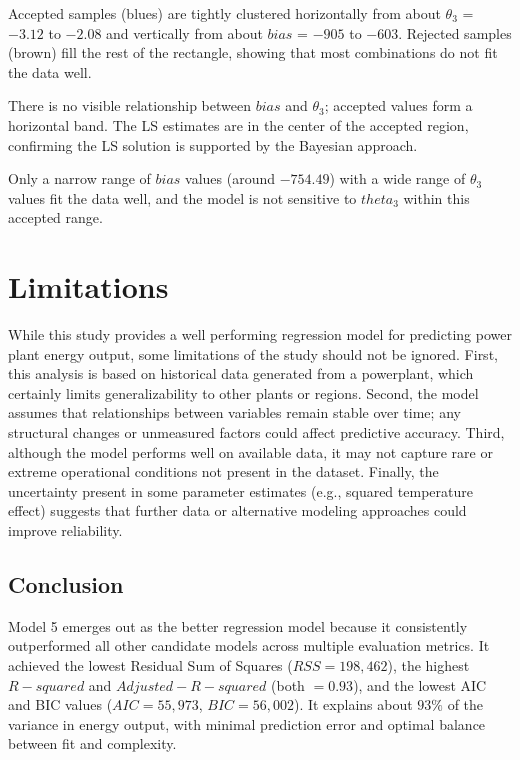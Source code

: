 \documentclass[12pt,a4paper]{article}
\begin{document}
Accepted samples (blues) are tightly clustered horizontally 
from about $\theta_3$ = $-3.12$ to $-2.08$ and vertically from 
about $bias$ = $-905$ to $-603$. Rejected samples (brown) fill the 
rest of the rectangle, showing that most combinations do not fit 
the data well.  

There is no visible relationship between $bias$ and $\theta_3$; 
accepted values form a horizontal band. The LS estimates are in 
the center of the accepted region, confirming the LS solution is 
supported by the Bayesian approach. 

Only a narrow range of $bias$ values (around $-754.49$) with a 
wide range of $\theta_3$ values fit the data well, and the model 
is not sensitive to $theta_3$ within this accepted range.


\section*{Limitations}

While this study provides a  well performing regression model 
for predicting power plant energy output, some limitations of the study 
should not be ignored. First, this analysis is based on historical data 
generated from a powerplant, which certainly limits generalizability to other 
plants or regions. Second, the model assumes that relationships 
between variables remain stable over time; any structural changes or 
unmeasured factors could affect predictive accuracy. Third, 
although the model performs well on available data, it may not 
capture rare or extreme operational conditions not present in the 
dataset. Finally, the uncertainty present in some parameter estimates 
(e.g., squared temperature effect) suggests that further data or 
alternative modeling approaches could improve reliability.

\subsection*{Conclusion}

Model 5 emerges out as the better regression model because it consistently 
outperformed all other candidate models across multiple evaluation metrics. 
It achieved the lowest Residual Sum of Squares ($RSS = 198,462$), the highest 
$R-squared$ and $Adjusted-R-squared$ (both $= 0.93$), and the lowest AIC and BIC values 
($AIC = 55,973$, $BIC = 56,002$). It explains about $93\%$ of the 
variance in energy output, with minimal prediction error and optimal 
balance between fit and complexity.
\end{document}
